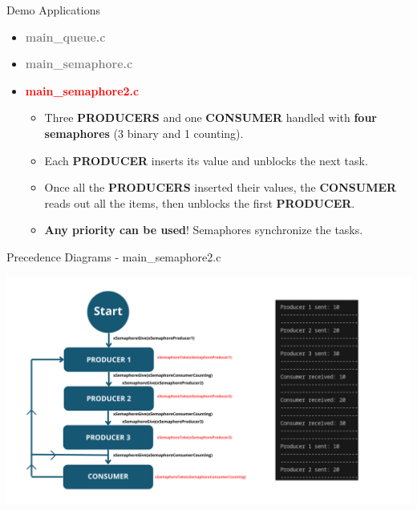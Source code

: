 \documentclass{beamer}
\begin{document}
\begin{frame}{Demo Applications}
        \begin{itemize}
        \item \textcolor{gray}{\textbf{main\_queue.c}}
        \item \textcolor{gray}{\textbf{main\_semaphore.c}}
        \item \textcolor{red}{\textbf{main\_semaphore2.c}}
        \begin{itemize}
            \item Three \textbf{PRODUCERS} and one \textbf{CONSUMER} handled with \textbf{four semaphores} (3 binary and 1 counting).
            \item Each \textbf{PRODUCER} inserts its value and unblocks the next task.
            \item Once all the \textbf{PRODUCERS} inserted their values, the \textbf{CONSUMER} reads out all the items, then unblocks the first \textbf{PRODUCER}.
            \item \textbf{Any priority can be used}! Semaphores synchronize the tasks.
        \end{itemize}
    \end{itemize}
\end{frame}

\begin{frame}{Precedence Diagrams - main\_semaphore2.c}

\vfill
\centering
\includegraphics[width=0.95\linewidth]{img/precedence_diagram_semaphore2.png} 
\vfill
    
\end{frame}
\end{document}
